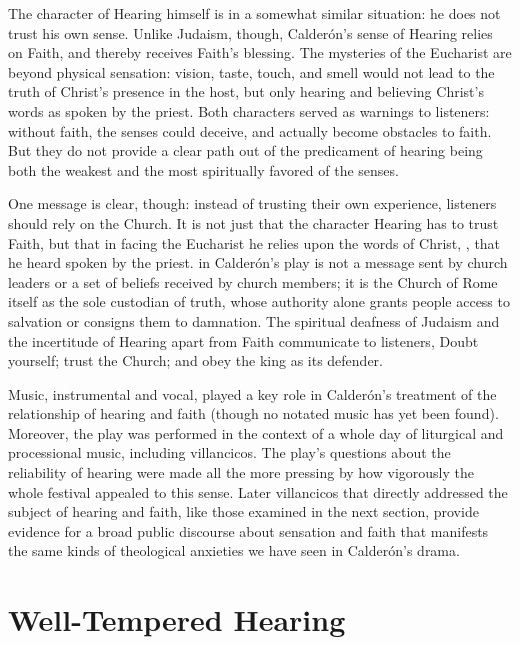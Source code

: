 The character of Hearing himself is in a somewhat similar situation: he does
not trust his own sense.
Unlike Judaism, though, Calderón's sense of Hearing relies on Faith, and
thereby receives Faith's blessing.
The mysteries of the Eucharist are beyond physical sensation: vision,
taste, touch, and smell would not lead to the truth of Christ's presence in the
host, but only hearing and believing Christ's words  as
spoken by the priest.
Both characters served as warnings to listeners: without faith, the senses
could deceive, and actually become obstacles to faith.
But they do not provide a clear path out of the predicament of hearing being
both the weakest and the most spiritually favored of the senses.

One message is clear, though: instead of trusting their own experience,
listeners should rely on the Church.
It is not just that the character Hearing has to trust Faith, but that in
facing the Eucharist he relies upon the words of Christ, , that he heard spoken by the priest.
 in Calderón's play is not a message sent by church leaders or a
set of beliefs received by church members; it is the Church of Rome itself as
the sole custodian of truth, whose authority alone grants people access to
salvation or consigns them to damnation.
The spiritual deafness of Judaism and the incertitude of Hearing apart from
Faith communicate to listeners, Doubt yourself; trust the Church; and obey the
king as its defender.

Music, instrumental and vocal, played a key role in Calderón's treatment of the
relationship of hearing and faith (though no notated music has yet been found).
Moreover, the play was performed in the context of a whole day of liturgical
and processional music, including villancicos.%
The play's questions about the reliability of hearing were made all the more
pressing by how vigorously the whole festival appealed to this sense.
Later villancicos that directly addressed the subject of hearing and faith,
like those examined in the next section, provide evidence for a broad public
discourse about sensation and faith that manifests the same kinds of
theological anxieties we have seen in Calderón's drama.

\section{Well-Tempered Hearing}

